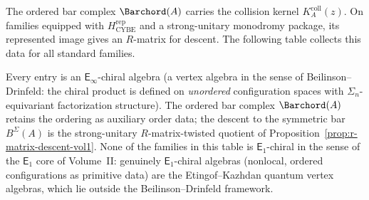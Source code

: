 The ordered bar complex $\Barchord(A)$ carries the collision kernel
$K_A^{\mathrm{coll}}(z)$.  On families equipped with
$H_{\mathrm{CYBE}}^{\mathrm{rep}}$ and a strong-unitary monodromy
package, its represented image gives an $R$-matrix for descent. The following table
collects this data for all standard families.

Every entry is an $\mathsf{E}_\infty$-chiral algebra
(a vertex algebra in the sense of Beilinson--Drinfeld:
the chiral product is defined on \emph{unordered}
configuration spaces with $\Sigma_n$-equivariant
factorization structure). The ordered bar complex
$\Barchord(A)$ retains the ordering as auxiliary order data;
the descent to the symmetric bar $B^\Sigma(A)$ is the
strong-unitary $R$-matrix-twisted quotient of
Proposition~\ref{prop:r-matrix-descent-vol1}.
None of the families in this table is $\mathsf{E}_1$-chiral in the sense
of the $\mathsf{E}_1$ core of Volume~II: genuinely $\mathsf{E}_1$-chiral algebras
(nonlocal, ordered configurations as primitive data) are the
Etingof--Kazhdan quantum vertex algebras, which lie outside
the Beilinson--Drinfeld framework.


